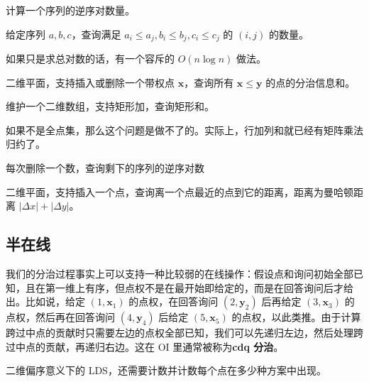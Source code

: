 \begin{exercise}[二维偏序]
    计算一个序列的逆序对数量。
\end{exercise}
\begin{exercise}[三维偏序]
    给定序列 $a,b,c$，查询满足 $a_i\le a_j,b_i\le b_j,c_i\le c_j$ 的 $(i,j)$ 的数量。
\end{exercise}
\begin{remark}
    如果只是求总对数的话，有一个容斥的 $O(n\log n)$ 做法。
\end{remark}
\begin{exercise}[带修二维数点]
    二维平面，支持插入或删除一个带权点 $\mathbf x$，查询所有 $\mathbf x\le \mathbf y$ 的点的分治信息和。
\end{exercise}
\begin{exercise}[全点集矩形加矩形求和]
    维护一个二维数组，支持矩形加，查询矩形和。
\end{exercise}
\begin{remark}
    如果不是全点集，那么这个问题是做不了的。实际上，行加列和就已经有矩阵乘法归约了。
\end{remark}
\begin{exercise}[P3157]
    每次删除一个数，查询剩下的序列的逆序对数
\end{exercise}
\begin{exercise}[P4169]
    二维平面，支持插入一个点，查询离一个点最近的点到它的距离，距离为曼哈顿距离 $|\Delta x|+|\Delta y|$。
\end{exercise}

\subsection{半在线}

我们的分治过程事实上可以支持一种比较弱的在线操作：假设点和询问初始全部已知，且在第一维上有序，但点权不是在最开始即给定的，而是在回答询问后才给出。比如说，给定 $(1,\mathbf x_1)$ 的点权，在回答询问 $(2,\mathbf y_2)$ 后再给定 $(3,\mathbf x_3)$ 的点权，然后再在回答询问 $(4,\mathbf y_4)$ 后给定 $(5,\mathbf x_5)$ 的点权，以此类推。由于计算跨过中点的贡献时只需要左边的点权全部已知，我们可以先递归左边，然后处理跨过中点的贡献，再递归右边。这在 OI 里通常被称为\textbf{cdq 分治}。

\begin{exercise}[P2487]
    二维偏序意义下的 LDS，还需要计数并计数每个点在多少种方案中出现。
\end{exercise}

